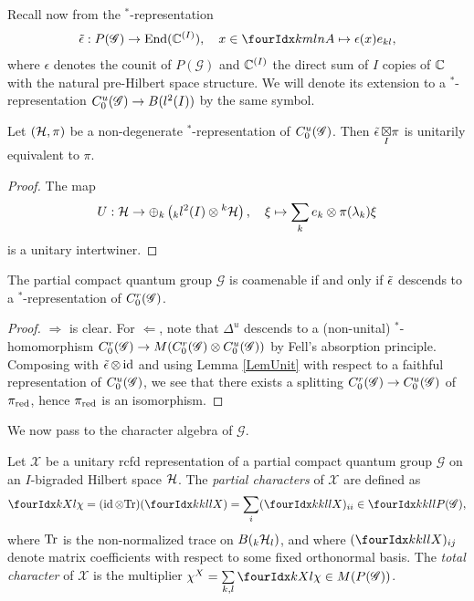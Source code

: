 Recall now from \cite{DCT1} the $^*$-representation 
\begin{align} \label{eq:weps}
  \weps: P(\mathscr{G}) \rightarrow \End(\C^{(I)}), \quad x\in
  \Gr{A}{k}{l}{m}{n}\mapsto \epsilon(x) e_{kl},
\end{align}
where $\epsilon$ denotes the counit of $P(\mathscr{G})$ and $\mathbb{C}^{(I)}$ the direct sum of $I$ copies of $\mathbb{C}$ with the natural pre-Hilbert space structure. We will denote its extension to a $^*$-representation $C^{u}_{0}(\mathscr{G})\rightarrow B(l^2(I))$ by the same symbol.

\begin{Lem}\label{LemUnit} Let $(\mathcal{H},\pi)$ be a non-degenerate $^*$-representation of $C^{u}_{0}(\mathscr{G})$. Then $\operatorname{\tilde{\epsilon}}\underset{I}{\boxtimes} \pi$ is unitarily equivalent to $\pi$.
\end{Lem} 
\begin{proof} The map \[U: \mathcal{H} \rightarrow \oplus_k \left({}_kl^2(I)\otimes {}^k\mathcal{H}\right),\quad \xi \mapsto \sum_k e_k\otimes \pi(\lambda_k)\xi\] is a unitary intertwiner.
\end{proof} 

\begin{Prop} The partial compact quantum group $\mathscr{G}$ is coamenable if and only if $\operatorname{\tilde{\epsilon}}$ descends to a $^*$-representation of $C^{r}_{0}(\mathscr{G})$.
\end{Prop} 
\begin{proof} $\Rightarrow$ is clear. For $\Leftarrow$, note that $\Delta^u$ descends to a (non-unital) $^*$-homomorphism $C^{r}_{0}(\mathscr{G})\rightarrow M(C^{r}_{0}(\mathscr{G})\otimes C^{u}_{0}(\mathscr{G}))$ by Fell's absorption principle. Composing with $\operatorname{\tilde{\epsilon}}\otimes \operatorname{id}$ and using Lemma \ref{LemUnit} with respect to a faithful representation of $C^{u}_{0}(\mathscr{G})$, we see that there exists a splitting $C^{r}_{0}(\mathscr{G})\rightarrow C^{u}_{0}(\mathscr{G})$ of $\pi_{\operatorname{\mathrm{red}}}$, hence $\pi_{\operatorname{\mathrm{red}}}$ is an isomorphism.
\end{proof}
 
We now pass to the character algebra of $\mathscr{G}$.
 
 \begin{Def} Let $\mathscr{X}$ be a unitary rcfd representation of a partial compact quantum group $\mathscr{G}$ on an $I$-bigraded Hilbert space $\mathcal{H}$. The \emph{partial characters} of $\mathscr{X}$ are defined as \[\Gr{\chi}{}{X}{k}{l} = (\id\otimes \Tr)(\Gr{X}{k}{l}{k}{l}) = \sum_i(\Gr{X}{k}{l}{k}{l})_{ii} \in \Gr{P(\mathscr{G})}{k}{l}{k}{l},\] where $\mathrm{Tr}$ is the non-normalized trace on $B({}_{k}\mathcal{H}_{l})$, and where $(\Gr{X}{k}{l}{k}{l})_{ij}$ denote matrix coefficients with respect to some fixed orthonormal basis. The \emph{total character} of $\mathscr{X}$ is the multiplier $\chi^X  =\underset{k,l}{\sum} \,\Gr{\chi}{}{X}{k}{l}\in M(P(\mathscr{G}))$.
 \end{Def}
 
